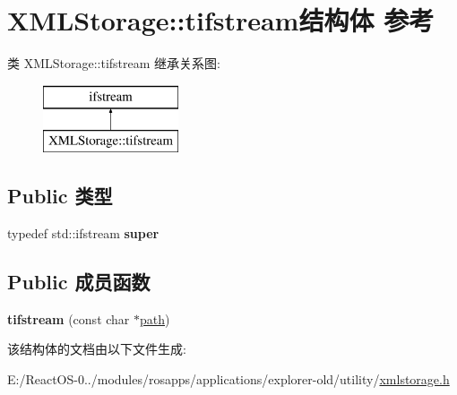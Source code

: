 \hypertarget{struct_x_m_l_storage_1_1tifstream}{}\section{X\+M\+L\+Storage\+:\+:tifstream结构体 参考}
\label{struct_x_m_l_storage_1_1tifstream}
类 X\+M\+L\+Storage\+:\+:tifstream 继承关系图\+:\begin{figure}[H]
\begin{center}
\leavevmode
\includegraphics[height=2.000000cm]{struct_x_m_l_storage_1_1tifstream}
\end{center}
\end{figure}
\subsection*{Public 类型}
\begin{DoxyCompactItemize}
\item 
\mbox{\label{struct_x_m_l_storage_1_1tifstream_a27404b84b863d191601fe350f41d5be5}} 
typedef std\+::ifstream {\bfseries super}
\end{DoxyCompactItemize}
\subsection*{Public 成员函数}
\begin{DoxyCompactItemize}
\item 
\mbox{\label{struct_x_m_l_storage_1_1tifstream_ab49122061e1c9a1da59c13ee0b593f9d}} 
{\bfseries tifstream} (const char $\ast$\hyperlink{structpath}{path})
\end{DoxyCompactItemize}


该结构体的文档由以下文件生成\+:\begin{DoxyCompactItemize}
\item 
E\+:/\+React\+O\+S-\/0../modules/rosapps/applications/explorer-\/old/utility/\hyperlink{xmlstorage_8h}{xmlstorage.\+h}\end{DoxyCompactItemize}
